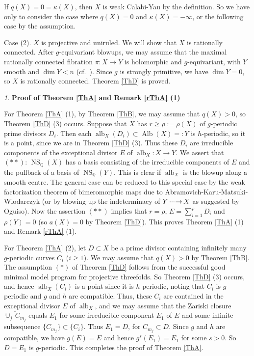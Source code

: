 \documentclass[11pt,a4paper,psamsfonts]{amsart}
\theoremstyle{plain}
\theoremstyle{definition}
\theoremstyle{remark}
\newtheorem{setup}[thm]{}
\begin{document}
If $q(X) = 0 = \kappa(X)$, then $X$ is weak Calabi-Yau by the definition.
So we have only to consider the case where $q(X) = 0$ and $\kappa(X) = -\infty$,
or the following case by the assumption.

Case (2). $X$ is projective and uniruled. We will show that $X$ is rationally connected.
After $g$-equivariant blowups, we may assume that the
maximal rationally connected
fibration $\pi: X \to Y$ is holomorphic and $g$-equivariant, with $Y$ smooth
and $\dim Y < n$ (cf.~\cite[Theorem C]{NZ}).
Since $g$ is strongly primitive, we have $\dim Y = 0$,
so $X$ is rationally connected.
Theorem \ref{ThD} is proved.

\begin{setup}
{\bf Proof of Theorem \ref{ThA} and Remark \ref{rThA} (1)}
\end{setup}

For Theorem \ref{ThA} (1), by Theorem \ref{ThB}, we may assume that $q(X) > 0$,
so Theorem \ref{ThD} (3) occurs.
Suppose that $X$ has $r \ge \rho := \rho(X)$
of $g$-periodic prime divisors $D_i$.
Then each ${\operatorname{alb}}_X(D_{i}) \subset {\operatorname{Alb}}(X) = : Y$ is $h$-periodic,
so it is a point, since we are in
Theorem \ref{ThD} (3).
Thus these $D_i$ are irreducible components of
the exceptional divisor $E$ of ${\operatorname{alb}}_X : X \to Y$.
We assert that $(**) : \, {\operatorname{NS}}_{\mathbb{Q}}(X)$ has a basis consisting of
the irreducible components of $E$
and the pullback of a basis of ${\operatorname{NS}}_{\mathbb{Q}}(Y)$.
This is clear if ${\operatorname{alb}}_X$ is the blowup along a smooth centre.
The general case can be reduced to this special case by
the weak factorization theorem of bimeromorphic maps due to
Abramovich-Karu-Matsuki-Wlodarczyk (or by blowing up the indeterminacy
of $Y {{\,\cdot\negmedspace\cdot\negmedspace\cdot\negmedspace\to\,}} X$ as suggested by Oguiso).
Now the assertion $(**)$ implies that $r = \rho$, $E = \sum_{i=1}^{\rho} D_i$
and $\rho(Y) = 0$ (so $a(X) = 0$ by Theorem \ref{ThD}).
This proves Theorem \ref{ThA} (1) and Remark \ref{rThA} (1).

For Theorem \ref{ThA} (2), let $D \subset X$ be a prime divisor containing
infinitely many $g$-periodic curves $C_i$ ($i \ge 1$).
We may assume that $q(X) > 0$ by Theorem \ref{ThB}.
The assumption $(*)$ of Theorem \ref{ThD} follows
from the successful good minimal model program for projective threefolds.
So Theorem \ref{ThD} (3) occurs, and hence ${\operatorname{alb}}_X(C_i)$ is a point
since it is $h$-periodic, noting that $C_i$ is $g$-periodic and
$g$ and $h$ are compatible. Thus, these $C_i$ are contained in
the exceptional divisor $E$ of ${\operatorname{alb}}_X$, and we may assume that
the Zariski closure $\overline{\cup_j \, C_{m_j}}$ equals $E_1$ for some irreducible component
$E_1$ of $E$ and some infinite subsequence $\{C_{m_j}\} \subset \{C_i\}$.
Thus $E_1 = D$, for $C_{m_j} \subset D$.
Since $g$ and $h$ are compatible, we have $g(E) = E$ and hence $g^s(E_1) = E_1$
for some $s > 0$. So $D = E_1$ is $g$-periodic.
This completes the proof of Theorem \ref{ThA}.
\end{document}
